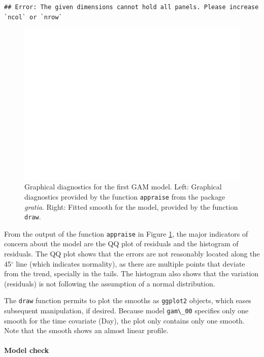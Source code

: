 \documentclass[
]{article}
\newcommand{\passthrough}[1]{#1}
\begin{document}
\begin{lstlisting}
## Error: The given dimensions cannot hold all panels. Please increase `ncol` or `nrow`
\end{lstlisting}

\begin{figure}[H]

{\centering \includegraphics[width=0.75\linewidth,]{Full_document_files/figure-latex/first-GAM-diag-1} 

}

\caption{Graphical diagnostics for the first GAM model. Left: Graphical diagnostics provided by the function \passthrough{\lstinline!appraise!} from the package \emph{gratia}. Right: Fitted smooth for the model, provided by the function \passthrough{\lstinline!draw!}.}\label{fig:first-GAM-diag}
\end{figure}

From the output of the function \passthrough{\lstinline!appraise!} in Figure \ref{fig:first-GAM-diag}, the major indicators of concern about the model are the QQ plot of residuals and the histogram of residuals. The QQ plot shows that the errors are not reasonably located along the 45\(^{\circ}\) line (which indicates normality), as there are multiple points that deviate from the trend, specially in the tails. The histogram also shows that the variation (residuals) is not following the assumption of a normal distribution.

The \passthrough{\lstinline!draw!} function permits to plot the smooths as \passthrough{\lstinline!ggplot2!} objects, which eases subsequent manipulation, if desired. Because model \passthrough{\lstinline!gam\_00!} specifies only one smooth for the time covariate (Day), the plot only contains only one smooth. Note that the smooth shows an almost linear profile.

\hypertarget{model-check}{%
\paragraph{Model check}\label{model-check}}
\end{document}
